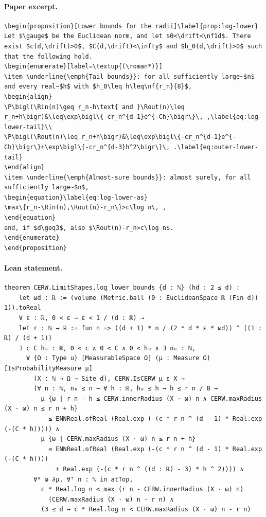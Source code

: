 \paragraph{Paper excerpt.}
\begin{verbatim}
\begin{proposition}[Lower bounds for the radii]\label{prop:log-lower}
Let $\gauge$ be the Euclidean norm, and let $0<\drift<\nf1d$. There exist $c(d,\drift)>0$, $C(d,\drift)<\infty$ and $h_0(d,\drift)>0$ such that the following hold.
\begin{enumerate}[label=\textup{(\roman*)}]
\item \underline{\emph{Tail bounds}}: for all sufficiently large~$n$ and every real~$h$ with $h_0\leq h\leq\nf{r_n}{8}$,
\begin{align}
\P\bigl(\Rin(n)\geq r_n-h\text{ and }\Rout(n)\leq r_n+h\bigr)&\leq\exp\bigl\{-cr_n^{d-1}e^{-Ch}\bigr\}\, ,\label{eq:log-lower-tail}\\
\P\bigl(\Rout(n)\leq r_n+h\bigr)&\leq\exp\bigl\{-cr_n^{d-1}e^{-Ch}\bigr\}+\exp\bigl\{-cr_n^{d-3}h^2\bigr\}\, .\label{eq:outer-lower-tail}
\end{align}
\item \underline{\emph{Almost-sure bounds}}: almost surely, for all sufficiently large~$n$,
\begin{equation}\label{eq:log-lower-as}
\max\{r_n-\Rin(n),\Rout(n)-r_n\}>c\log n\, ,
\end{equation}
and, if $d\geq3$, also $\Rout(n)-r_n>c\log n$.
\end{enumerate}
\end{proposition}
\end{verbatim}
\paragraph{Lean statement.}
\begin{verbatim}
theorem CERW.LimitShapes.log_lower_bounds {d : ℕ} (hd : 2 ≤ d) :
    let ωd : ℝ := (volume (Metric.ball (0 : EuclideanSpace ℝ (Fin d)) 1)).toReal
    ∀ ε : ℝ, 0 < ε → ε < 1 / (d : ℝ) →
    let r : ℕ → ℝ := fun n => ((d + 1) * n / (2 * d * ε * ωd)) ^ ((1 : ℝ) / (d + 1))
    ∃ c C h₀ : ℝ, 0 < c ∧ 0 < C ∧ 0 < h₀ ∧ ∃ n₀ : ℕ,
      ∀ {Ω : Type u} [MeasurableSpace Ω] (μ : Measure Ω) [IsProbabilityMeasure μ]
        (X : ℕ → Ω → Site d), CERW.IsCERW μ ε X →
        (∀ n : ℕ, n₀ ≤ n → ∀ h : ℝ, h₀ ≤ h → h ≤ r n / 8 →
          μ {ω | r n - h ≤ CERW.innerRadius (X · ω) n ∧ CERW.maxRadius (X · ω) n ≤ r n + h}
            ≤ ENNReal.ofReal (Real.exp (-(c * r n ^ (d - 1) * Real.exp (-(C * h))))) ∧
          μ {ω | CERW.maxRadius (X · ω) n ≤ r n + h}
            ≤ ENNReal.ofReal (Real.exp (-(c * r n ^ (d - 1) * Real.exp (-(C * h))))
              + Real.exp (-(c * r n ^ ((d : ℝ) - 3) * h ^ 2)))) ∧
        ∀ᵐ ω ∂μ, ∀ᶠ n : ℕ in atTop,
          c * Real.log n < max (r n - CERW.innerRadius (X · ω) n)
            (CERW.maxRadius (X · ω) n - r n) ∧
          (3 ≤ d → c * Real.log n < CERW.maxRadius (X · ω) n - r n)
\end{verbatim}

